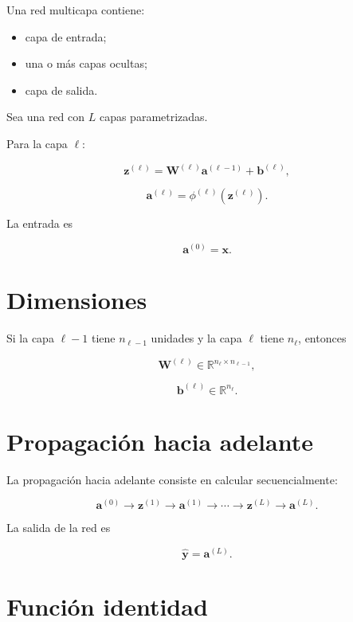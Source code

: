 \documentclass[
  spanish,
  10.5pt,
  letterpaper,
  DIV=11,
  numbers=noendperiod,
  oneside,
  open=any]{scrreprt}
\providecommand{\tightlist}{%
  \setlength{\itemsep}{0pt}\setlength{\parskip}{0pt}}
\theoremstyle{definition}
\theoremstyle{definition}
\theoremstyle{plain}
\theoremstyle{remark}
\begin{document}

Una red multicapa contiene:

\begin{itemize}
\tightlist
\item
  capa de entrada;
\item
  una o más capas ocultas;
\item
  capa de salida.
\end{itemize}

Sea una red con \(L\) capas parametrizadas.

Para la capa \(\ell\):

\[
\mathbf{z}^{(\ell)}
=
\mathbf{W}^{(\ell)}
\mathbf{a}^{(\ell-1)}
+
\mathbf{b}^{(\ell)},
\]

\[
\mathbf{a}^{(\ell)}
=
\phi^{(\ell)}
\left(
\mathbf{z}^{(\ell)}
\right).
\]

La entrada es

\[
\mathbf{a}^{(0)}=\mathbf{x}.
\]

\section*{Dimensiones}\label{dimensiones}


Si la capa \(\ell-1\) tiene \(n_{\ell-1}\) unidades y la capa \(\ell\)
tiene \(n_\ell\), entonces

\[
\mathbf{W}^{(\ell)}
\in
\mathbb{R}^{n_\ell\times n_{\ell-1}},
\]

\[
\mathbf{b}^{(\ell)}
\in
\mathbb{R}^{n_\ell}.
\]

\section*{Propagación hacia
adelante}\label{propagaciuxf3n-hacia-adelante}


La propagación hacia adelante consiste en calcular secuencialmente:

\[
\mathbf{a}^{(0)}
\to
\mathbf{z}^{(1)}
\to
\mathbf{a}^{(1)}
\to
\cdots
\to
\mathbf{z}^{(L)}
\to
\mathbf{a}^{(L)}.
\]

La salida de la red es

\[
\widehat{\mathbf{y}}
=
\mathbf{a}^{(L)}.
\]

\section*{Función identidad}\label{funciuxf3n-identidad}
\end{document}
